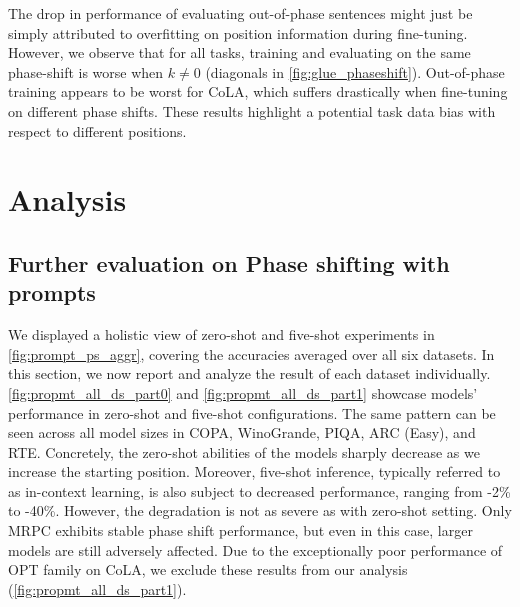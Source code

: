\documentclass[letterpaper, 12pt]{report}
\begin{document}


The drop in performance of evaluating out-of-phase sentences might just be simply attributed to overfitting on position information during fine-tuning.
However, we observe that for all tasks, training and evaluating on the same phase-shift is worse when $k \ne 0$ (diagonals in \autoref{fig:glue_phaseshift}).
Out-of-phase training appears to be worst for CoLA, which suffers drastically when fine-tuning on different phase shifts.
These results highlight a potential task data bias with respect to different positions.



\section{Analysis}
\label{sec:pos_analysis}

\subsection{Further evaluation on Phase shifting with prompts}
\label{sec:pos_further_eval_prompts}

We displayed a holistic view of zero-shot and five-shot experiments in \autoref{fig:prompt_ps_aggr}, covering the accuracies averaged over all six datasets.
In this section, we now report and analyze the result of each dataset individually. \autoref{fig:propmt_all_ds_part0} and \autoref{fig:propmt_all_ds_part1} showcase models' performance in zero-shot and five-shot configurations.
The same pattern can be seen across all model sizes in COPA, WinoGrande, PIQA, ARC (Easy), and RTE. Concretely, the zero-shot abilities of the models sharply decrease as we increase the starting position.
Moreover, five-shot inference, typically referred to as in-context learning, is also subject to decreased performance, ranging from -2\% to -40\%. However, the degradation is not as severe as with zero-shot setting.
Only MRPC exhibits stable phase shift performance, but even in this case, larger models are still adversely affected. Due to the exceptionally poor performance of OPT family on CoLA, we exclude these results from our analysis (\autoref{fig:propmt_all_ds_part1}).
\end{document}
